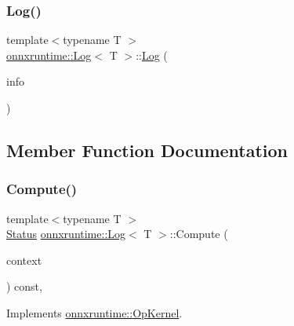 \subsubsection{\texorpdfstring{Log()}{Log()}}
{\footnotesize\ttfamily template$<$typename T $>$ \\
\mbox{\hyperlink{classonnxruntime_1_1Log}{onnxruntime\+::\+Log}}$<$ T $>$\+::\mbox{\hyperlink{classonnxruntime_1_1Log}{Log}} (\begin{DoxyParamCaption}\item[{const \mbox{\hyperlink{classonnxruntime_1_1OpKernelInfo}{Op\+Kernel\+Info}} \&}]{info }\end{DoxyParamCaption})\hspace{0.3cm}{\ttfamily [inline]}}



\subsection{Member Function Documentation}
\mbox{\label{classonnxruntime_1_1Log_a41efdf9271b5b737c8809e5447f32334}} 
\subsubsection{\texorpdfstring{Compute()}{Compute()}\hspace{0.1cm}{\footnotesize\ttfamily [1/2]}}
{\footnotesize\ttfamily template$<$typename T $>$ \\
\mbox{\hyperlink{classonnxruntime_1_1common_1_1Status}{Status}} \mbox{\hyperlink{classonnxruntime_1_1Log}{onnxruntime\+::\+Log}}$<$ T $>$\+::Compute (\begin{DoxyParamCaption}\item[{\mbox{\hyperlink{classonnxruntime_1_1OpKernelContext}{Op\+Kernel\+Context}} $\ast$}]{context }\end{DoxyParamCaption}) const\hspace{0.3cm}{\ttfamily [override]}, {\ttfamily [virtual]}}



Implements \mbox{\hyperlink{classonnxruntime_1_1OpKernel_a9eca8656a78b1b3ab9d3351a12798650}{onnxruntime\+::\+Op\+Kernel}}.

\mbox{\label{classonnxruntime_1_1Log_aeb014ad0f4b041d1b008e0d6fc67a80a}} 
